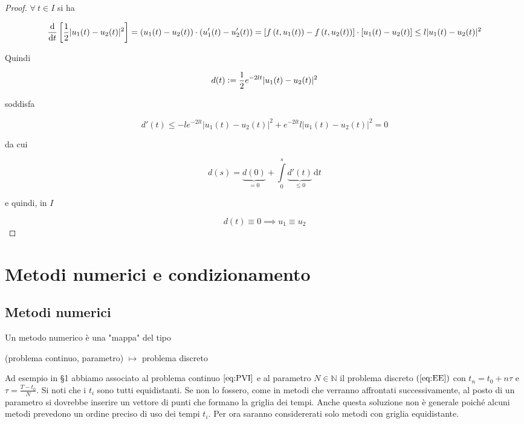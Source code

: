 \documentclass[hidelinks, 10pt]{report}
\begin{document}
\begin{proof}
$ \forall\ t \in I $ si ha

\begin{dmath*}
{ \frac{\mathrm{d}}{\mathrm{d}t} \left[ \frac{1}{2} \vert u_{1}(t) - u_{2}(t) \vert^{2} \right] } = { \left( u_{1}(t) - u_{2}(t) \right) \cdot \left( u_{1}' (t) - u_{2}' (t) \right) } = \\ { [ f \left( t, u_{1}(t) \right) - f \left( t, u_{2}(t) \right) ] \cdot [u_{1}(t) - u_{2}(t)] } \le { l \vert u_{1}(t) - u_{2} (t) \vert^{2} }
\end{dmath*}

Quindi

\[ d(t) \vcentcolon= \frac{1}{2} e^{-2lt} \vert u_{1}(t) - u_{2}(t) \vert^{2} \]

soddisfa

\[ d'(t) \le -l e^{-2lt} \vert u_{1}(t) - u_{2}(t) \vert^{2} + e^{-2lt} l \vert u_{1}(t) - u_{2}(t) \vert^{2} = 0 \]

da cui

\[ d(s) = \underbrace{d(0)}_{= 0} + \int\limits_{0}^{s} \underbrace{d'(t)}_{\le 0} \, \mathrm{d}t \]

e quindi, in $ I $

\[ d(t) \equiv 0 \implies u_{1} \equiv u_{2}  \]
\end{proof}

\section{Metodi numerici e condizionamento}
\subsection{Metodi numerici}

Un metodo numerico \`e una "mappa" del tipo

\begin{center}
(problema continuo, parametro) $ \mapsto $ problema discreto
\end{center}

Ad esempio in \S 1 abbiamo associato al problema continuo $ \ref{eq:PVI} $ e al parametro $ N \in \mathbb{N} $ il problema discreto $ (\ref{eq:EE}) $ con $ t_{n} = t_{0} + n \tau $ e $ \tau = \frac{T - t_{0}}{N} $. Si noti che i $ t_{i} $ sono tutti equidistanti. Se non lo fossero, come in metodi che verranno affrontati successivamente, al posto di un parametro si dovrebbe inserire un vettore di punti che formano la griglia dei tempi. Anche questa soluzione non \`e generale poich\'e alcuni metodi prevedono un ordine preciso di uso dei tempi $ t_{i} $. Per ora saranno considererati solo metodi con griglia equidistante.
\end{document}
